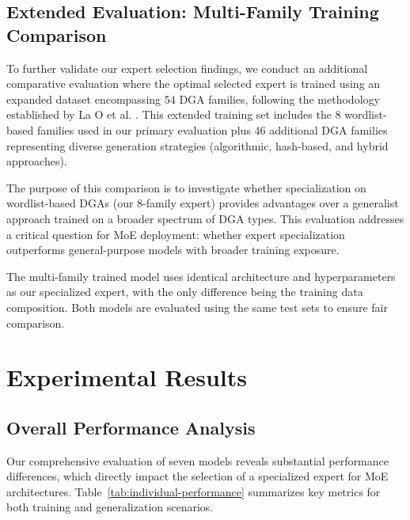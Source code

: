 \documentclass[a4paper]{llncs}
\begin{document}
\subsection{Extended Evaluation: Multi-Family Training Comparison}

To further validate our expert selection findings, we conduct an additional comparative evaluation where the optimal selected expert is trained using an expanded dataset encompassing 54 DGA families, following the methodology established by La O et al. \cite{la2024llms}. This extended training set includes the 8 wordlist-based families used in our primary evaluation plus 46 additional DGA families representing diverse generation strategies (algorithmic, hash-based, and hybrid approaches).

The purpose of this comparison is to investigate whether specialization on wordlist-based DGAs (our 8-family expert) provides advantages over a generalist approach trained on a broader spectrum of DGA types. This evaluation addresses a critical question for MoE deployment: whether expert specialization outperforms general-purpose models with broader training exposure.

The multi-family trained model uses identical architecture and hyperparameters as our specialized expert, with the only difference being the training data composition. Both models are evaluated using the same test sets to ensure fair comparison.


\section{Experimental Results}
\label{sec:results}

\subsection{Overall Performance Analysis}

Our comprehensive evaluation of seven models reveals substantial performance differences, which directly impact the selection of a specialized expert for MoE architectures. Table~\ref{tab:individual-performance} summarizes key metrics for both training and generalization scenarios.
\end{document}
